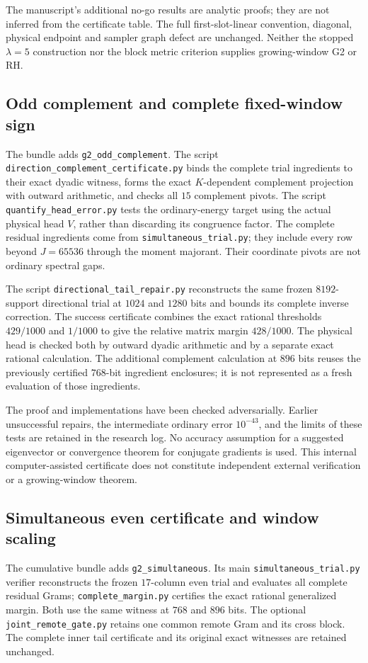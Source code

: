 \documentclass[11pt]{article}
\theoremstyle{remark}
\begin{document}
The manuscript's additional no-go results are analytic proofs; they
are not inferred from the certificate table. The full first-slot-linear
convention, diagonal, physical endpoint and sampler graph defect are
unchanged. Neither the stopped $\lambda=5$ construction nor the block
metric criterion supplies growing-window G2 or RH.

\subsection*{Odd complement and complete fixed-window sign}
\label{app:v126-complement}
The bundle adds \texttt{g2\_odd\_complement}.  The script
\texttt{direction\_complement\_certificate.py} binds the complete
trial ingredients to their exact dyadic witness, forms the exact
$K$-dependent complement projection with outward arithmetic, and
checks all $15$ complement pivots.  The script
\texttt{quantify\_head\_error.py} tests the ordinary-energy target
using the actual physical head $V$, rather than discarding its
congruence factor.  The complete residual ingredients come from
\texttt{simultaneous\_trial.py}; they include every row beyond
$J=65536$ through the moment majorant.  Their coordinate pivots
are not ordinary spectral gaps.

The script \texttt{directional\_tail\_repair.py} reconstructs the
same frozen $8192$-support directional trial at $1024$ and $1280$
bits and bounds its complete inverse correction. The success
certificate combines the exact rational thresholds $429/1000$
and $1/1000$ to give the relative matrix margin $428/1000$.
The physical head is checked both by outward dyadic arithmetic
and by a separate exact rational calculation. The additional
complement calculation at $896$ bits reuses the previously
certified $768$-bit ingredient enclosures; it is not represented
as a fresh evaluation of those ingredients.

The proof and implementations have been checked adversarially.
Earlier unsuccessful repairs, the intermediate ordinary error
$10^{-43}$, and the limits of these tests are retained in the
research log. No accuracy assumption for a suggested eigenvector
or convergence theorem for conjugate gradients is used. This
internal computer-assisted certificate does not constitute
independent external verification or a growing-window theorem.

\subsection*{Simultaneous even certificate and window scaling}
\label{app:v125-simultaneous}
The cumulative bundle adds \texttt{g2\_simultaneous}. Its main
\texttt{simultaneous\_trial.py} verifier reconstructs the frozen
$17$-column even trial and evaluates all complete residual Grams;
\texttt{complete\_margin.py} certifies the exact rational generalized
margin. Both use the same witness at $768$ and $896$ bits.
The optional \texttt{joint\_remote\_gate.py} retains one common
remote Gram and its cross block. The complete inner tail certificate
and its original exact witnesses are retained unchanged.
\end{document}
